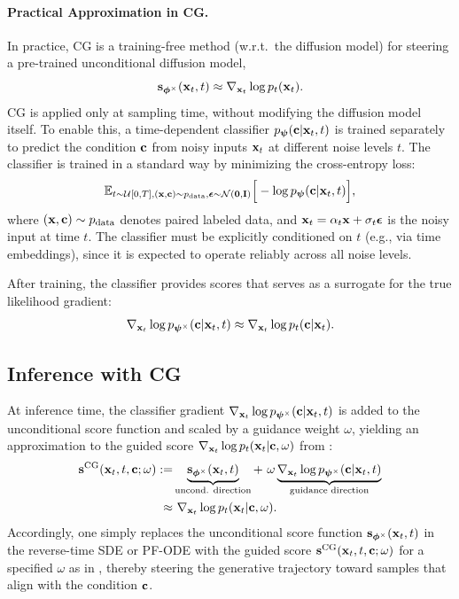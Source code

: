 \paragraph{Practical Approximation in CG.}
In practice, CG is a training-free method  (w.r.t.\ the diffusion model) for steering a pre-trained unconditional diffusion model,
\[
{\mathbf{s}}_{\bm{\phi}^\times}({\mathbf{x}}_t ,t) \approx \nabla_{{\mathbf{x}}_t} \log p_t({\mathbf{x}}_t).
\]
CG is applied only at sampling time, without modifying the diffusion model itself. To enable this, a time-dependent classifier $p_{{\bm{\psi}}}({\mathbf{c}} |{\mathbf{x}}_t,t)$ is trained separately to predict the condition ${\mathbf{c}}$ from noisy inputs ${\mathbf{x}}_t$ at different noise levels $t$. The classifier is trained in a standard way by minimizing the cross-entropy loss:
\begin{align}
\mathbb{E}_{t \sim \mathcal{U}[0,T], ({\mathbf{x}}, {\mathbf{c}}) \sim p_{\text{data}},  \bm{\epsilon} \sim \mathcal{N}(\mathbf{0}, \mathbf{I})}
\Big[ -\log p_{{\bm{\psi}}}({\mathbf{c}} | {\mathbf{x}}_t,t) \Big],
\end{align}
where $({\mathbf{x}},{\mathbf{c}})\sim p_{\text{data}}$ denotes paired labeled data, and ${\mathbf{x}}_t = \alpha_t {\mathbf{x}} + \sigma_t \bm{\epsilon}$ is the noisy input at time $t$. The classifier must be explicitly conditioned on $t$ (e.g., via time embeddings), since it is expected to operate reliably across all noise levels.

After training, the classifier provides scores that serves as a surrogate for the true likelihood gradient:
\[
\nabla_{{\mathbf{x}}_t} \log p_{{\bm{\psi}}^\times}({\mathbf{c}} |{\mathbf{x}}_t,t) \approx \nabla_{{\mathbf{x}}_t} \log p_t({\mathbf{c}} |{\mathbf{x}}_t).
\]


\subsection{Inference with CG}
At inference time, the classifier gradient $\nabla_{{\mathbf{x}}_t} \log p_{{\bm{\psi}}^\times}({\mathbf{c}} | {\mathbf{x}}_t,t)$ is added to the unconditional score function and scaled by a guidance weight $\omega$, yielding an approximation to the guided score $\nabla_{{\mathbf{x}}_t} \log p_t({\mathbf{x}}_t | {\mathbf{c}}, \omega)$ from :
\begin{align*} 
 {\mathbf{s}}^{\text{CG}}({\mathbf{x}}_t ,t, {\mathbf{c}}; \omega) :=& \underbrace{{\mathbf{s}}_{\bm{\phi}^\times}({\mathbf{x}}_t ,t)}_{\text{uncond. direction}} + ~\omega \underbrace{\nabla_{{\mathbf{x}}_t} \log p_{{\bm{\psi}}^\times}({\mathbf{c}} | {\mathbf{x}}_t,t)}_{\text{guidance direction}}
 \\ \approx &~\nabla_{{\mathbf{x}}_t} \log p_t({\mathbf{x}}_t | {\mathbf{c}}, \omega).
\end{align*}
Accordingly, one simply replaces the unconditional score function ${\mathbf{s}}_{\bm{\phi}^\times}({\mathbf{x}}_t ,t)$ in the reverse-time SDE or PF-ODE with the guided score ${\mathbf{s}}^{\text{CG}}({\mathbf{x}}_t ,t, {\mathbf{c}}; \omega)$ for a specified $\omega$ as in , thereby steering the generative trajectory toward samples that align with the condition ${\mathbf{c}}$.



